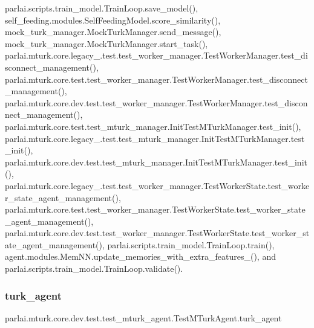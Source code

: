 parlai.\+scripts.\+train\+\_\+model.\+Train\+Loop.\+save\+\_\+model(), self\+\_\+feeding.\+modules.\+Self\+Feeding\+Model.\+score\+\_\+similarity(), mock\+\_\+turk\+\_\+manager.\+Mock\+Turk\+Manager.\+send\+\_\+message(), mock\+\_\+turk\+\_\+manager.\+Mock\+Turk\+Manager.\+start\+\_\+task(), parlai.\+mturk.\+core.\+legacy\+\_.\+test.\+test\+\_\+worker\+\_\+manager.\+Test\+Worker\+Manager.\+test\+\_\+disconnect\+\_\+management(), parlai.\+mturk.\+core.\+test.\+test\+\_\+worker\+\_\+manager.\+Test\+Worker\+Manager.\+test\+\_\+disconnect\+\_\+management(), parlai.\+mturk.\+core.\+dev.\+test.\+test\+\_\+worker\+\_\+manager.\+Test\+Worker\+Manager.\+test\+\_\+disconnect\+\_\+management(), parlai.\+mturk.\+core.\+test.\+test\+\_\+mturk\+\_\+manager.\+Init\+Test\+M\+Turk\+Manager.\+test\+\_\+init(), parlai.\+mturk.\+core.\+legacy\+\_.\+test.\+test\+\_\+mturk\+\_\+manager.\+Init\+Test\+M\+Turk\+Manager.\+test\+\_\+init(), parlai.\+mturk.\+core.\+dev.\+test.\+test\+\_\+mturk\+\_\+manager.\+Init\+Test\+M\+Turk\+Manager.\+test\+\_\+init(), parlai.\+mturk.\+core.\+legacy\+\_.\+test.\+test\+\_\+worker\+\_\+manager.\+Test\+Worker\+State.\+test\+\_\+worker\+\_\+state\+\_\+agent\+\_\+management(), parlai.\+mturk.\+core.\+test.\+test\+\_\+worker\+\_\+manager.\+Test\+Worker\+State.\+test\+\_\+worker\+\_\+state\+\_\+agent\+\_\+management(), parlai.\+mturk.\+core.\+dev.\+test.\+test\+\_\+worker\+\_\+manager.\+Test\+Worker\+State.\+test\+\_\+worker\+\_\+state\+\_\+agent\+\_\+management(), parlai.\+scripts.\+train\+\_\+model.\+Train\+Loop.\+train(), agent.\+modules.\+Mem\+N\+N.\+update\+\_\+memories\+\_\+with\+\_\+extra\+\_\+features\+\_\+(), and parlai.\+scripts.\+train\+\_\+model.\+Train\+Loop.\+validate().

\mbox{\label{classparlai_1_1mturk_1_1core_1_1dev_1_1test_1_1test__mturk__agent_1_1TestMTurkAgent_ad9a5d68dacd93bc427ed4f9eca011c46}} 
\subsubsection{\texorpdfstring{turk\+\_\+agent}{turk\_agent}}
{\footnotesize\ttfamily parlai.\+mturk.\+core.\+dev.\+test.\+test\+\_\+mturk\+\_\+agent.\+Test\+M\+Turk\+Agent.\+turk\+\_\+agent}



